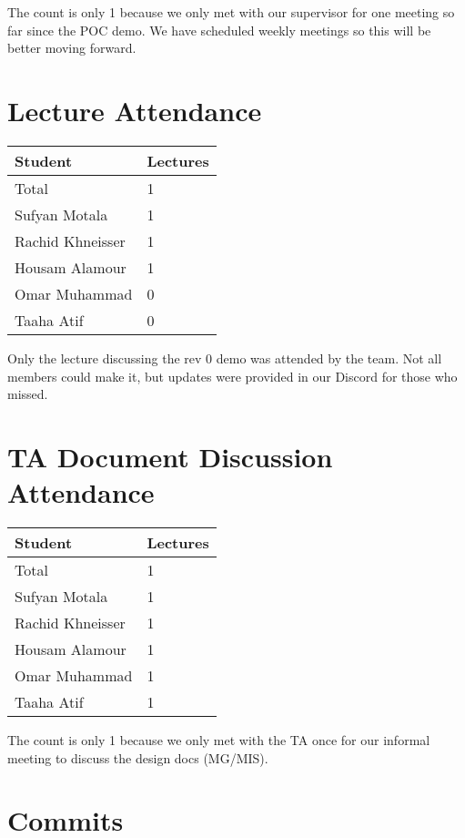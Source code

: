 \documentclass{article}
\begin{document}
The count is only 1 because we only met with our supervisor for one meeting so far since the POC demo. We have scheduled weekly meetings so this will be better moving forward.

\section{Lecture Attendance}

\begin{table}[H]
\centering
\begin{tabular}{ll}
\toprule
\textbf{Student} & \textbf{Lectures}\\
\midrule
Total & 1\\
Sufyan Motala & 1\\
Rachid Khneisser & 1\\
Housam Alamour & 1\\
Omar Muhammad & 0\\
Taaha Atif & 0\\
\bottomrule
\end{tabular}
\end{table}

Only the lecture discussing the rev 0 demo was attended by the team. Not all members could make it, but updates were provided in our Discord for those who missed.

\section{TA Document Discussion Attendance}

\begin{table}[H]
\centering
\begin{tabular}{ll}
\toprule
\textbf{Student} & \textbf{Lectures}\\
\midrule
Total & 1\\
Sufyan Motala & 1\\
Rachid Khneisser & 1\\
Housam Alamour & 1\\
Omar Muhammad & 1\\
Taaha Atif & 1\\
\bottomrule
\end{tabular}
\end{table}

The count is only 1 because we only met with the TA once for our informal meeting to discuss the design docs (MG/MIS).

\section{Commits}
\end{document}
